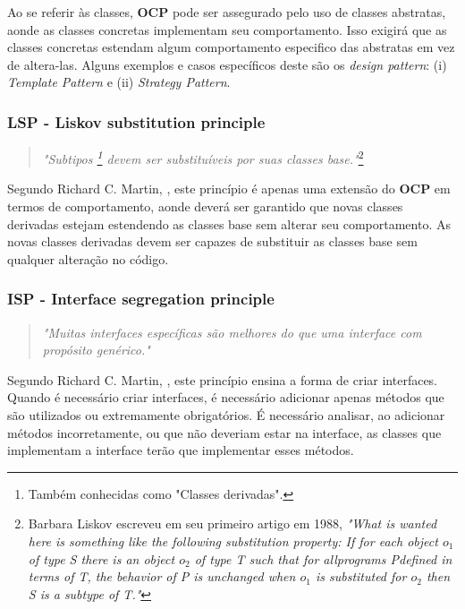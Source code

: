 \documentclass[12pt]{article}
\begin{document}
Ao se referir às classes, \textbf{OCP} pode ser assegurado pelo uso de classes abstratas, aonde as classes concretas implementam seu comportamento. Isso exigirá que as classes concretas estendam algum comportamento especifico das abstratas em vez de altera-las. Alguns exemplos e casos específicos deste são os \textit{design pattern}: (i) \textit{Template Pattern} e (ii) \textit{Strategy Pattern}.

\subsubsection{LSP - Liskov substitution principle}
\begin{quote}
	\textit{"Subtipos \footnote{Também conhecidas como "Classes derivadas".} devem ser substituíveis por suas classes base."}\footnote{Barbara Liskov escreveu em seu primeiro artigo em 1988, \textit{"What is wanted here is something like the following substitution property: If for each object $ o_1 $ of type S there is an object $ o_2 $ of type T such that for allprograms Pdefined in terms of T, the behavior of P is unchanged when $ o_1 $ is substituted for $ o_2 $ then S is a subtype of T."} }	
\end{quote}

Segundo Richard C. Martin, \cite{ROBERT_MARTIN_THE_CLEAN_ARCHITECTURE}, este princípio é apenas uma extensão do \textbf{OCP} em termos de comportamento, aonde deverá ser garantido que novas classes derivadas estejam estendendo as classes base sem alterar seu comportamento. As novas classes derivadas devem ser capazes de substituir as classes base sem qualquer alteração no código.

\subsubsection{ISP - Interface segregation principle}
\begin{quote}
	\textit{"Muitas interfaces específicas são melhores do que uma interface com propósito genérico."}	
\end{quote}

Segundo Richard C. Martin, \cite{ROBERT_MARTIN_THE_CLEAN_ARCHITECTURE}, este princípio ensina a forma de criar interfaces. Quando é necessário criar interfaces, é necessário adicionar apenas métodos que são utilizados ou extremamente obrigatórios. É necessário analisar, ao adicionar métodos incorretamente, ou que não deveriam estar na interface, as classes que implementam a interface terão que implementar esses métodos. 
\end{document}
